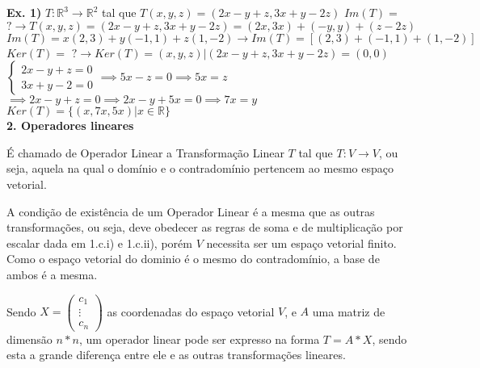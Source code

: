 \documentclass[11pt,a4paper]{article}
\newcommand\tab[1][1.835cm]{\hspace*{#1}}
\newcommand\taba[1][2.55cm]{\hspace*{#1}}
\begin{document}
\begin{flushleft}
\taba \textbf{Ex. 1)} $T: \mathbb{R}^3 \rightarrow \mathbb{R}^2$ tal que $T(x,y,z) = (2x-y+z, 3x+y-2z)$ \linebreak
\taba $Im(T) =$ $ ? \rightarrow T(x,y,z) = (2x-y+z, 3x+y-2z) = (2x,3x) + (-y,y) + (z-2z)$ \linebreak
\taba $Im(T) = x(2,3) + y(-1,1) + z(1,-2) \rightarrow Im(T) = [(2,3) + (-1,1) + (1,-2)]$ \linebreak
\newline
\taba $Ker(T) = $ $? \rightarrow Ker(T) = {(x,y,z)|(2x-y+z,3x+y-2z) = (0,0)}$ \linebreak
\taba $\begin{cases} 2x-y+z=0\\ 3x+y-2=0 \end{cases} \implies 5x-z = 0 \implies 5x = z$ \newline
\newline \taba \hspace{3.15cm} $\implies 2x-y+z =0 \implies 2x-y+5x =0 \implies 7x = y$
\newline \taba $Ker(T) = \{(x,7x,5x) | x \in \mathbb{R}\}$
\\
\textbf{2. Operadores lineares}\linebreak

\tab É chamado de Operador Linear a Transformação Linear $T$ tal que $T: V \rightarrow V$, ou seja, aquela na qual o domínio e o contradomínio pertencem ao mesmo espaço vetorial.\linebreak

\tab A condição de existência de um Operador Linear é a mesma que as outras transformações, ou seja, deve obedecer as regras de soma e de multiplicação por escalar dada em 1.c.i) e 1.c.ii), porém $V$ necessita ser um espaço vetorial finito. Como o espaço vetorial do dominio é o mesmo do contradomínio, a base de ambos é a mesma.\linebreak

\tab Sendo $X = \begin{pmatrix} c_1 \\ \vdots \\ c_n \end{pmatrix}$ as coordenadas do espaço vetorial $V$, e $A$ uma matriz de dimensão $n*n$, um operador linear pode ser expresso na forma $T = A*X$, sendo esta a grande diferença entre ele e as outras transformações lineares. \linebreak


\end{flushleft}
\end{document}
